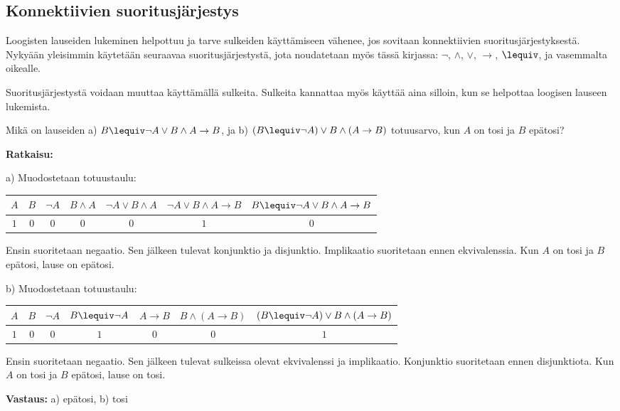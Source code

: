 \bigskip

\subsection*{Konnektiivien suoritusjärjestys} 
Loogisten lauseiden lukeminen helpottuu ja tarve sulkeiden käyttämiseen vähenee, jos sovitaan konnektiivien suoritusjärjestyksestä. Nykyään yleisimmin käytetään seuraavaa suoritusjärjestystä, jota noudatetaan myös tässä kirjassa: $\lnot$, $\land$, $\lor$, $\to$, $\lequiv$, ja vasemmalta oikealle.

Suoritusjärjestystä voidaan muuttaa käyttämällä sulkeita. Sulkeita kannattaa myös käyttää aina silloin, kun se helpottaa loogisen lauseen lukemista.

\begin{esimerkki}
Mikä on lauseiden a) $B \lequiv \lnot A\lor B \land A \to B$, ja  b)  $(B\lequiv \lnot A)\lor B \land (A\to B)$  totuusarvo, kun $A$ on tosi ja $B$ epätosi?   

{\bf Ratkaisu:}


a) Muodostetaan totuustaulu:

\begin{footnotesize}
\begin{center}
\begin{tabular}{|c|c|c|c|c|c|c|}\hline
$A$ & $B$ & $\lnot A$ & $B \land A $ & $\lnot A\lor B \land A$ & $\lnot A\lor B \land A \to B$ & $B \lequiv \lnot A\lor B \land A \to B$\\ \hline
$1$ & $0$ & $0$ & $0$ & $0$ & $1$ & $0$\\ \hline
\end{tabular}
\end{center}
\end{footnotesize}

Ensin suoritetaan negaatio. Sen jälkeen tulevat konjunktio ja disjunktio. Implikaatio 	suoritetaan ennen ekvivalenssia. 	Kun $A$ on tosi ja $B$ epätosi, lause on epätosi.


b) Muodostetaan totuustaulu:

\begin{footnotesize}
\begin{center}
\begin{tabular}{|c|c|c|c|c|c|c|}\hline
$A$ & $B$ & $\lnot A$ & $B\lequiv \lnot A$ & $A\to B$ & $B \land (A\to B)$ &  $(B\lequiv \lnot A)\lor B \land (A\to B)$\\ \hline
$1$ & $0$ & $0$ & $1$ & $0$ & $0$ & $1$\\ \hline
\end{tabular}
\end{center}
\end{footnotesize}

Ensin suoritetaan negaatio. Sen jälkeen tulevat sulkeissa olevat ekvivalenssi ja implikaatio. Konjunktio suoritetaan ennen disjunktiota. Kun $A$ on tosi ja $B$ epätosi, lause on tosi.

{\bf Vastaus:} a) epätosi, b) tosi
\end{esimerkki}

